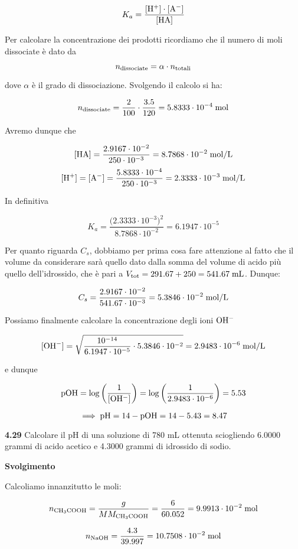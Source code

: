 $$K_a=\rm \frac{[H^+] \cdot [A^-]}{[HA]}$$

Per calcolare la concentrazione dei prodotti ricordiamo che il numero di moli dissociate è dato da

$$n_{\rm dissociate}=\alpha \cdot n_{\rm totali}$$

dove $\alpha$ è il grado di dissociazione. Svolgendo il calcolo si ha:

$$n_{\rm dissociate}
=\frac{2}{100} \cdot \frac{3.5}{120}
=5.8333 \cdot 10^{-4} \; \rm mol$$

Avremo dunque che

$$\rm [HA]=\frac{2.9167 \cdot 10^{-2}}{250 \cdot 10^{-3}}=8.7868 \cdot 10^{-2} \; mol/L$$
$$\rm [H^+]=[A^-]=\frac{5.8333 \cdot 10^{-4}}{250 \cdot 10^{-3}}=2.3333 \cdot 10^{-3} \; mol/L$$

In definitiva

$$K_a=\frac{\big( 2.3333 \cdot 10^{-3} \big)^2}{8.7868 \cdot 10^{-2}}=6.1947 \cdot 10^{-5}$$

Per quanto riguarda $C_s$, dobbiamo per prima cosa fare attenzione al fatto che il volume da considerare sarà quello dato dalla somma del volume di acido più quello dell'idrossido, che è pari a $V_{\rm tot}=291.67 + 250=541.67 \; \rm mL$. Dunque:

$$C_s=\frac{2.9167 \cdot 10^{-2}}{541.67 \cdot 10^{-3}}=5.3846 \cdot 10^{-2} \; \rm mol/L$$

Possiamo finalmente calcolare la concentrazione degli ioni $\rm OH^-$

$$[\text{OH}^-]
=\sqrt{\frac{10^{-14}}{6.1947 \cdot 10^{-5}} \cdot 5.3846 \cdot 10^{-2}}
=2.9483 \cdot 10^{-6} \; \rm mol/L$$

e dunque

$$\rm pOH=\log\left(\frac{1}{[OH^-]}\right)=\log\left(\frac{1}{2.9483 \cdot 10^{-6}}\right)=5.53$$

$$\implies \rm pH=14 - pOH=14 - 5.43=8.47$$

\textbf{4.29} Calcolare il pH di una soluzione di 780 mL ottenuta sciogliendo 6.0000 grammi di acido acetico e 4.3000 grammi di idrossido di sodio.

\vspace{0.2cm}\large\textbf{Svolgimento}\normalsize

Calcoliamo innanzitutto le moli:

$$n_{\rm CH_3COOH}=\frac{g}{MM_{\rm CH_3COOH}}=\frac{6}{60.052}=9.9913 \cdot 10^{-2} \; \rm mol$$

$$n_{\rm NaOH}=\frac{4.3}{39.997}=10.7508 \cdot 10^{-2} \; \rm mol$$

